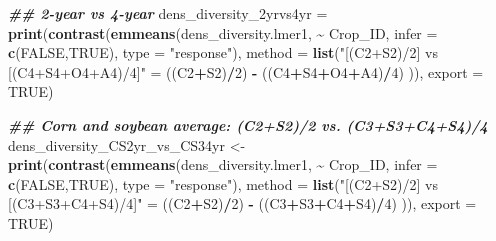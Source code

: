 \documentclass[
]{article}
\newenvironment{Shaded}{\begin{snugshade}}{\end{snugshade}}
\newcommand{\AttributeTok}[1]{\textcolor[rgb]{0.13,0.29,0.53}{#1}}
\newcommand{\ConstantTok}[1]{\textcolor[rgb]{0.56,0.35,0.01}{#1}}
\newcommand{\DecValTok}[1]{\textcolor[rgb]{0.00,0.00,0.81}{#1}}
\newcommand{\DocumentationTok}[1]{\textcolor[rgb]{0.56,0.35,0.01}{\textbf{\textit{#1}}}}
\newcommand{\FunctionTok}[1]{\textcolor[rgb]{0.13,0.29,0.53}{\textbf{#1}}}
\newcommand{\NormalTok}[1]{#1}
\newcommand{\OtherTok}[1]{\textcolor[rgb]{0.56,0.35,0.01}{#1}}
\newcommand{\SpecialCharTok}[1]{\textcolor[rgb]{0.81,0.36,0.00}{\textbf{#1}}}
\newcommand{\StringTok}[1]{\textcolor[rgb]{0.31,0.60,0.02}{#1}}
\begin{document}
\begin{Shaded}
\begin{Highlighting}[]
\DocumentationTok{\#\# 2{-}year vs 4{-}year }
\NormalTok{dens\_diversity\_2yrvs4yr }\OtherTok{=} \FunctionTok{print}\NormalTok{(}\FunctionTok{contrast}\NormalTok{(}\FunctionTok{emmeans}\NormalTok{(dens\_diversity.lmer1, }\SpecialCharTok{\textasciitilde{}}\NormalTok{ Crop\_ID,}
                                                 \AttributeTok{infer =} \FunctionTok{c}\NormalTok{(}\ConstantTok{FALSE}\NormalTok{,}\ConstantTok{TRUE}\NormalTok{),  }
                                                 \AttributeTok{type =} \StringTok{"response"}\NormalTok{), }
                                         \AttributeTok{method =} \FunctionTok{list}\NormalTok{(}\StringTok{"[(C2+S2)/2] vs [(C4+S4+O4+A4)/4]"} \OtherTok{=} 
\NormalTok{                                                         ((C2}\SpecialCharTok{+}\NormalTok{S2)}\SpecialCharTok{/}\DecValTok{2}\NormalTok{) }\SpecialCharTok{{-}}\NormalTok{ ((C4}\SpecialCharTok{+}\NormalTok{S4}\SpecialCharTok{+}\NormalTok{O4}\SpecialCharTok{+}\NormalTok{A4)}\SpecialCharTok{/}\DecValTok{4}\NormalTok{) )), }
                                \AttributeTok{export =} \ConstantTok{TRUE}\NormalTok{)}


\DocumentationTok{\#\# Corn and soybean average: (C2+S2)/2 vs. (C3+S3+C4+S4)/4}
\NormalTok{dens\_diversity\_CS2yr\_vs\_CS34yr }\OtherTok{\textless{}{-}} \FunctionTok{print}\NormalTok{(}\FunctionTok{contrast}\NormalTok{(}\FunctionTok{emmeans}\NormalTok{(dens\_diversity.lmer1, }\SpecialCharTok{\textasciitilde{}}\NormalTok{ Crop\_ID,}
                                                         \AttributeTok{infer =} \FunctionTok{c}\NormalTok{(}\ConstantTok{FALSE}\NormalTok{,}\ConstantTok{TRUE}\NormalTok{),}
                                                         \AttributeTok{type =} \StringTok{"response"}\NormalTok{), }
                                                 \AttributeTok{method =} \FunctionTok{list}\NormalTok{(}\StringTok{"[(C2+S2)/2] vs [(C3+S3+C4+S4)/4]"} \OtherTok{=} 
\NormalTok{                                                                 ((C2}\SpecialCharTok{+}\NormalTok{S2)}\SpecialCharTok{/}\DecValTok{2}\NormalTok{) }\SpecialCharTok{{-}}\NormalTok{ ((C3}\SpecialCharTok{+}\NormalTok{S3}\SpecialCharTok{+}\NormalTok{C4}\SpecialCharTok{+}\NormalTok{S4)}\SpecialCharTok{/}\DecValTok{4}\NormalTok{) )),}
                                        \AttributeTok{export =} \ConstantTok{TRUE}\NormalTok{)}


\end{Highlighting}
\end{Shaded}
\end{document}
